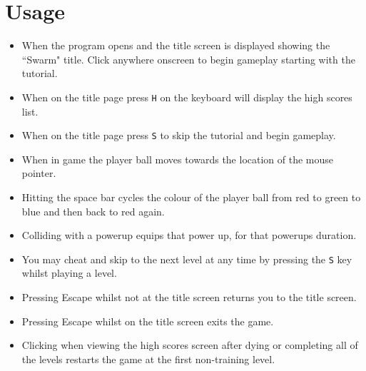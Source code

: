 \section{Usage}

\begin{itemize}
	\item When the program opens and the title screen is displayed showing the ``Swarm" title. Click anywhere onscreen to begin gameplay starting with the tutorial.
	\item When on the title page press \verb!H! on the keyboard will display the high scores list.
	\item When on the title page press \verb!S! to skip the tutorial and begin gameplay.
	\item When in game the player ball moves towards the location of the mouse pointer.
	\item Hitting the space bar cycles the colour of the player ball from red to green to blue and then back to red again.
	\item Colliding with a powerup equips that power up, for that powerups duration.
	\item You may cheat and skip to the next level at any time by pressing the \verb!S! key whilst playing a level.
	\item Pressing Escape whilst not at the title screen returns you to the title screen.
	\item Pressing Escape whilst on the title screen exits the game.
	\item Clicking when viewing the high scores screen after dying or completing all of the levels restarts the game at the first non-training level.
\end{itemize}